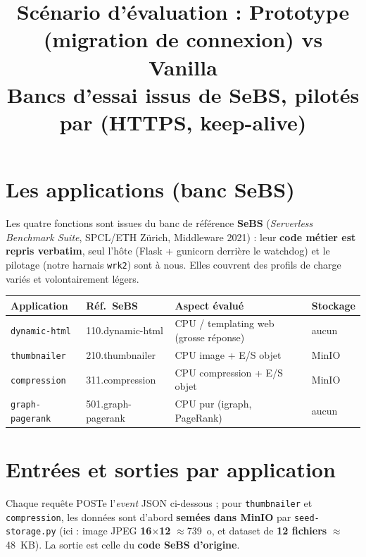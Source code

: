\documentclass[10pt,a4paper]{article}
\title{\vspace{-1.3cm}\textbf{Scénario d'évaluation : Prototype (migration de connexion) vs Vanilla}\\
\large Bancs d'essai issus de SeBS, pilotés par \code{wrk2} (HTTPS, keep-alive)}
\author{}\date{}
\newcommand{\code}[1]{\texttt{\small #1}}
\begin{document}
\maketitle
\vspace{-1.4cm}

\section{Les applications (banc SeBS)}
Les quatre fonctions sont issues du banc de référence \textbf{SeBS} (\emph{Serverless Benchmark
Suite}, SPCL/ETH Zürich, Middleware 2021) : leur \textbf{code métier est repris verbatim}, seul
l'hôte (Flask + gunicorn derrière le watchdog) et le pilotage (notre harnais \code{wrk2}) sont à nous.
Elles couvrent des profils de charge variés et volontairement légers.

\begin{center}\small
\begin{tabular}{@{}llll@{}}
\toprule
\textbf{Application} & \textbf{Réf.\ SeBS} & \textbf{Aspect évalué} & \textbf{Stockage} \\
\midrule
\code{dynamic-html}   & 110.dynamic-html   & CPU / templating web (grosse réponse) & aucun \\
\code{thumbnailer}    & 210.thumbnailer    & CPU image + E/S objet                 & MinIO \\
\code{compression}    & 311.compression    & CPU compression + E/S objet           & MinIO \\
\code{graph-pagerank} & 501.graph-pagerank & CPU pur (igraph, PageRank)            & aucun \\
\bottomrule
\end{tabular}
\end{center}

\section{Entrées et sorties par application}
Chaque requête POSTe l'\emph{event} JSON ci-dessous ; pour \code{thumbnailer} et \code{compression},
les données sont d'abord \textbf{semées dans MinIO} par \code{seed-storage.py} (ici : image JPEG
\textbf{16$\times$12} $\approx$739~o, et dataset de \textbf{12 fichiers} $\approx$48~KB). La sortie est
celle du \textbf{code SeBS d'origine}.
\end{document}
